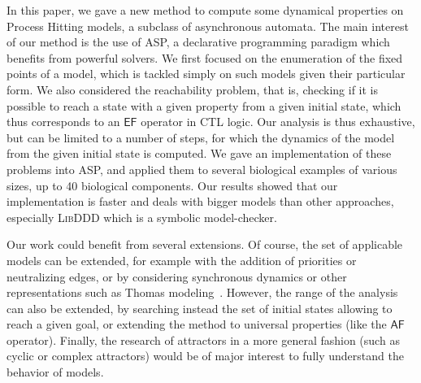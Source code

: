 In this paper, we gave a new method to compute some dynamical properties
on Process Hitting models, a subclass of asynchronous automata.
The main interest of our method is the use of ASP,
a declarative programming paradigm which benefits from powerful solvers.
We first focused on the enumeration of the fixed points of a model,
which is tackled simply on such models given their particular form.
We also considered the reachability problem, that is,
checking if it is possible to reach a state with a given property
from a given initial state,
which thus corresponds to an $\mathsf{EF}$ operator in CTL logic.
Our analysis is thus exhaustive, but can be limited to a number of steps,
for which the dynamics of the model from the given initial state is computed.
We gave an implementation of these problems into ASP,
and applied them to several biological examples of various sizes, up to
40 biological components.
Our results showed that our implementation is faster and deals with bigger models
than other approaches, especially \textsc{LibDDD} which is a symbolic model-checker.

Our work could benefit from several extensions.
Of course, the set of applicable models can be extended,
for example with the addition
of priorities or neutralizing edges,
or by considering synchronous dynamics or other representations
such as Thomas modeling~\cite{BernotSemBRN}.
However, the range of the analysis can also be extended,
by searching instead the set of initial states
allowing to reach a given goal,
or extending the method to universal properties (like the $\mathsf{AF}$ operator).
Finally, the research of attractors in a more general fashion
(such as cyclic or complex attractors)
would be of major interest to fully understand the behavior of models.
